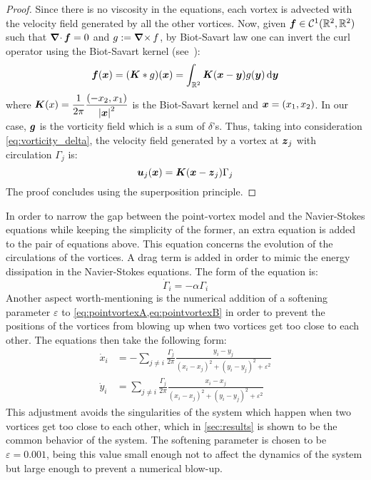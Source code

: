 \documentclass[../main.tex]{subfiles}
\begin{document}
\begin{proof}
	Since there is no viscosity in the equations, each vortex is advected with the velocity field generated by all the other vortices. Now, given $\boldsymbol{f}\in \mathcal{C}^1(\mathbb{R}^2,\mathbb{R}^2)$ such that $\operatorname{\boldsymbol{\nabla}\cdot} \boldsymbol{f} = 0$ and $g:=\operatorname{\boldsymbol{\nabla}\times} f$, by Biot-Savart law one can invert the curl operator using the Biot-Savart kernel (see~\cite{Griffiths}):
	\begin{equation}
		\boldsymbol{f}(\boldsymbol{x}) = (\boldsymbol{K} * g)(\boldsymbol{x}) = \int_{\mathbb{R}^2} \boldsymbol{K}(\boldsymbol{x}-\boldsymbol{y}) g(\boldsymbol{y}) \dd{\boldsymbol{y}}
	\end{equation}
	where $\displaystyle\boldsymbol{K}(x) = \frac{1}{2\pi} \frac{(-x_2,x_1)}{{\abs{\boldsymbol{x}}^2}}$ is the Biot-Savart kernel and $\boldsymbol{x}=(x_1,x_2)$. In our case, $\boldsymbol{g}$ is the vorticity field which is a sum of $\delta$'s. Thus, taking into consideration \cref{eq:vorticity_delta}, the velocity field generated by a vortex at $\boldsymbol{z}_j$ with circulation $\Gamma_j$ is:
	\begin{equation}
		\boldsymbol{u}_j(\boldsymbol{x}) = \boldsymbol{K}(\boldsymbol{x}-\boldsymbol{z}_j) \Gamma_j
	\end{equation}
	The proof concludes using the superposition principle.
\end{proof}
In order to narrow the gap between the point-vortex model and the Navier-Stokes equations while keeping the simplicity of the former, an extra equation is added to the pair of equations above. This equation concerns the evolution of the circulations of the vortices. A drag term is added in order to mimic the energy dissipation in the Navier-Stokes equations. The form of the equation is:
\begin{equation}
	\dot{\Gamma}_i = -\alpha \Gamma_i
\end{equation}
Another aspect worth-mentioning is the numerical addition of a softening parameter $\varepsilon$ to \cref{eq:pointvortexA,eq:pointvortexB} in order to prevent the positions of the vortices from blowing up when two vortices get too close to each other. The equations then take the following form:
\begin{align}
	\dot{x}_i & = -\sum_{j\neq i} \frac{\Gamma_j}{2\pi} \frac{y_i-y_j}{{(x_i-x_j)}^2+{(y_i-y_j)}^2+\varepsilon^2} \\
	\dot{y}_i & = \sum_{j\neq i} \frac{\Gamma_j}{2\pi} \frac{x_i-x_j}{{(x_i-x_j)}^2+{(y_i-y_j)}^2+\varepsilon^2}
\end{align}
This adjustment avoids the singularities of the system which happen when two vortices get too close to each other, which in \cref{sec:results} is shown to be the common behavior of the system. The softening parameter is chosen to be $\varepsilon=0.001$, being this value small enough not to affect the dynamics of the system but large enough to prevent a numerical blow-up.
\end{document}
